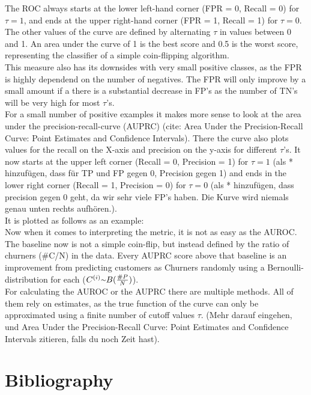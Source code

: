 \documentclass[12pt,titlepage]{article}
\begin{document}
The ROC always starts at the lower left-hand corner (FPR = 0, Recall = 0) for $\tau=1$, and ends at the upper right-hand corner (FPR = 1, Recall = 1) for $\tau=0$. The other values of the curve are defined by alternating $\tau$ in values between 0 and 1. An area under the curve of 1 is the best score and 0.5 is the worst score, representing the classifier of a simple coin-flipping algorithm. \\
This measure also has its downsides with very small positive classes, as the FPR is highly dependend on the number of negatives. The FPR will only improve by a small amount if a there is a substantial decrease in FP's as the number of TN's will be very high for most $\tau$'s. \\
For a small number of positive examples it makes more sense to look at the area under the precision-recall-curve (AUPRC) (cite: Area Under the Precision-Recall Curve: Point Estimates and Confidence Intervals). There the curve also plots values for the recall on the X-axis and precision on the y-axis for different $\tau$'s. It now starts at the upper left corner (Recall = 0, Precision = 1) for $\tau=1$ (als * hinzufügen, dass für TP und FP gegen 0, Precision gegen 1) and ends in the lower right corner (Recall = 1, Precision = 0) for $\tau=0$ (als * hinzufügen, dass precision gegen 0 geht, da wir sehr viele FP's haben. Die Kurve wird niemals genau unten rechts aufhören.). \\
It is plotted as follows as an example:\\
Now when it comes to interpreting the metric, it is not as easy as the AUROC. The baseline now is not a simple coin-flip, but instead defined by the ratio of churners (\#C/N) in the data. Every AUPRC score above that baseline is an improvement from predicting customers as Churners randomly using a Bernoulli-distribution for each ($C^{(i)}{\raise.17ex\hbox{$\scriptstyle\mathtt{\sim}$}} B(\frac{\#P}{N})$). \\
For calculating the AUROC or the AUPRC there are multiple methods. All of them rely on estimates, as the true function of the curve can only be approximated using a finite number of cutoff values $\tau$. (Mehr darauf eingehen, und Area Under the Precision-Recall Curve: Point Estimates and Confidence Intervals zitieren, falls du noch Zeit hast). \\


\newpage

\thispagestyle{empty}

\section*{Bibliography}
\vspace*{6mm}
\end{document}

